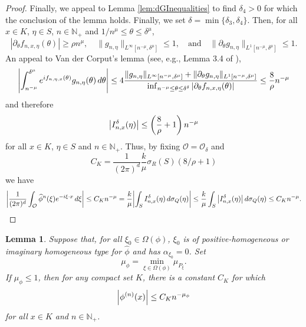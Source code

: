 \documentclass[11pt]{article}
\newtheorem{lemma}[theorem]{Lemma}
\newcommand{\f}[2]{\frac{#1}{#2}}
\begin{document}
\begin{proof}
Finally, we appeal to Lemma \ref{lem:dGInequalities} to find $\delta_4>0$ for which the conclusion of the lemma holds. Finally, we set $\delta=\min\{\delta_3,\delta_4\}$. Then, for all $x\in K$, $\eta\in S$, $n\in\mathbb{N}_+$ and $1/n^{\mu}\leq \theta\leq \delta^\mu$, 
\begin{equation*}
    |\partial_\theta f_{n,x,\eta}(\theta)|\geq \rho n^{\mu}, 
    \quad 
    \|g_{n,\eta}\|_{L^\infty[n^{-\mu},\delta^\mu]}\leq 1, 
    \quad
    \mbox{and}
    \quad 
    \|\partial_\theta g_{n,\eta}\|_{L^1[n^{-\mu},\delta^\mu]}\leq 1.
\end{equation*}
An appeal to Van der Corput's lemma (see, e.g., Lemma 3.4 of \cite{Randles2015}),
\begin{equation*}
    \abs{\int_{n^{-\mu}}^{\delta^\mu}e^{if_{n,\eta,x}(\theta)}g_{n,\eta}(\theta)\,d\theta}
    \leq 
    4
    \frac{ 
    \|g_{n,\eta}\|_{L^\infty[n^{-\mu},\delta^{\mu}]}
    +
    \|\partial_{\theta}g_{n,\eta}\|_{L^1[n^{-\mu},\delta^{\mu}]}
    }{
    \inf_{n^{-\mu}\leq\theta\leq \delta^{\delta}}|\partial_{\theta}f_{n,x,\eta}(\theta)|
    }\leq \frac{8}{\rho}n^{-\mu}
\end{equation*}
and therefore
\begin{equation*}
    \abs{I_{n,x}^\delta(\eta)}\leq \left(\frac{8}{\rho}+1\right)n^{-\mu}
\end{equation*}
for all $x\in K$, $\eta\in S$ and $n\in\mathbb{N}_+$. Thus, by fixing $\mathcal{O}=\mathcal{O}_\delta$ and 
\begin{equation*}
    C_K=\f{1}{(2\pi)^d} \f{k}{\mu} \sigma_R(S)(8/\rho+1)
\end{equation*}
we have
\begin{equation*}
\abs{\f{1}{(2\pi)^d}\int_{\mathcal{O}}\widehat{\phi}^n(\xi)e^{-i\xi\cdot x}\,d\xi}\leq C_Kn^{-\mu}
=
\f{k}{\mu}\abs{\int_S I^\delta_{n,x}(\eta)\,d\sigma_Q(\eta)} 
\leq \f{k}{\mu}\int_S \abs{I^\delta_{n,x}(\eta)}\,d\sigma_Q(\eta) 
\leq C_K n^{-\mu}. 
\end{equation*}
\end{proof}




\begin{lemma}
Suppose that, for all $\xi_0\in \Omega(\phi)$, $\xi_0$ is of positive-homogeneous or imaginary homogeneous type for $\widehat{\phi}$ and has $\alpha_{\xi_0}=0$. Set
\begin{equation*}
    \mu_{\phi}=\min_{\xi\in\Omega(\phi)}\mu_{P_{\xi}}.
\end{equation*}
If $\mu_{\phi}\leq 1$, then for any compact set $K$, there is a constant $C_K$ for which
\begin{equation*}
    \abs{\phi^{(n)}(x)}\leq C_Kn^{-\mu_{\phi}}
\end{equation*}
for all $x\in K$ and $n\in\mathbb{N}_+$. 
\end{lemma}
\end{document}
